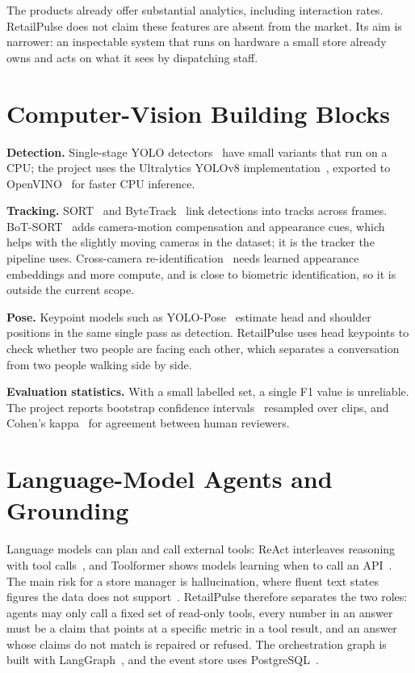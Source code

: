 The products already offer substantial analytics, including interaction rates. RetailPulse does not claim these features are absent from the market. Its aim is narrower: an inspectable system that runs on hardware a small store already owns and acts on what it sees by dispatching staff.

\section{Computer-Vision Building Blocks}
\textbf{Detection.} Single-stage YOLO detectors~\cite{redmon2016yolo} have small variants that run on a CPU; the project uses the Ultralytics YOLOv8 implementation~\cite{ultralytics}, exported to OpenVINO~\cite{openvino} for faster CPU inference.

\textbf{Tracking.} SORT~\cite{bewley2016sort} and ByteTrack~\cite{zhang2022bytetrack} link detections into tracks across frames. BoT-SORT~\cite{aharon2022botsort} adds camera-motion compensation and appearance cues, which helps with the slightly moving cameras in the dataset; it is the tracker the pipeline uses. Cross-camera re-identification~\cite{ye2022reid} needs learned appearance embeddings and more compute, and is close to biometric identification, so it is outside the current scope.

\textbf{Pose.} Keypoint models such as YOLO-Pose~\cite{maji2022yolopose} estimate head and shoulder positions in the same single pass as detection. RetailPulse uses head keypoints to check whether two people are facing each other, which separates a conversation from two people walking side by side.

\textbf{Evaluation statistics.} With a small labelled set, a single F1 value is unreliable. The project reports bootstrap confidence intervals~\cite{efron1979bootstrap} resampled over clips, and Cohen's kappa~\cite{cohen1960kappa} for agreement between human reviewers.

\section{Language-Model Agents and Grounding}
Language models can plan and call external tools: ReAct interleaves reasoning with tool calls~\cite{yao2023react}, and Toolformer shows models learning when to call an API~\cite{schick2023toolformer}. The main risk for a store manager is hallucination, where fluent text states figures the data does not support~\cite{ji2023hallucination}. RetailPulse therefore separates the two roles: agents may only call a fixed set of read-only tools, every number in an answer must be a claim that points at a specific metric in a tool result, and an answer whose claims do not match is repaired or refused. The orchestration graph is built with LangGraph~\cite{langgraph}, and the event store uses PostgreSQL~\cite{postgresql}.

